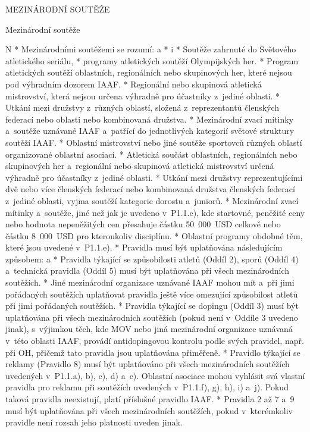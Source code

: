 \chap MEZINÁRODNÍ SOUTĚŽE

\secc Mezinárodní soutěže

\begitems \style N
* Mezinárodními soutěžemi se rozumí:
  \begitems \style a
  *
    \begitems \style i
    * Soutěže zahrnuté do Světového atletického seriálu,
    * programy atletických soutěží Olympijských her.
    \enditems
  * Program atletických soutěží oblastních, regionálních nebo skupinových her, které nejsou pod výhradním dozorem IAAF.
  * Regionální nebo skupinová atletická mistrovství, která nejsou určena výhradně pro účastníky z~jediné oblasti.
  * Utkání mezi družstvy z~různých oblastí, složená z~reprezentantů členských federací nebo oblasti nebo kombinovaná družstva.
  * Mezinárodní zvací mítinky a~soutěže uznávané IAAF a~patřící do jednotlivých kategorií světové struktury soutěží IAAF.
  * Oblastní mistrovství nebo jiné soutěže sportovců různých oblastí organizované oblastní asociací.
  * Atletická součást oblastních, regionálních nebo skupinových her a~regionální nebo skupinová atletická mistrovství určená výhradně pro účastníky z~jediné oblasti.
  * Utkání mezi družstvy reprezentujícími dvě nebo více členských federací nebo kombinovaná družstva členských federací z~jediné oblasti, vyjma soutěží kategorie dorostu a~juniorů.
  * Mezinárodní zvací mítinky a~soutěže, jiné než jak je uvedeno v~P1.1.e), kde startovné, peněžité ceny nebo hodnota nepeněžitých cen přesahuje částku 50~000~USD celkově nebo částku 8~000~USD pro kteroukoliv disciplínu.
  * Oblastní programy obdobné těm, které jsou uvedené v~P1.1.e).
  \enditems
* Pravidla musí být uplatňována následujícím způsobem:
  \begitems \style a
  * Pravidla týkající se způsobilosti atletů (Oddíl 2), sporů (Oddíl 4) a~technická pravidla (Oddíl 5) musí být uplatňována při všech mezinárodních soutěžích.
  * Jiné mezinárodní organizace uznávané IAAF mohou mít a~při jimi pořádaných soutěžích uplatňovat pravidla ještě více omezující způsobilost atletů při jimi pořádaných soutěžích.
  * Pravidla týkající se dopingu (Oddíl 3) musí být uplatňována při všech mezinárodních soutěžích (pokud není v~Oddíle 3 uvedeno jinak), s~výjimkou těch, kde MOV nebo jiná mezinárodní organizace uznávaná v~této oblasti IAAF, provádí antidopingovou kontrolu podle svých pravidel, např. při OH, přičemž tato pravidla jsou uplatňována přiměřeně.
  * Pravidlo týkající se reklamy (Pravidlo 8) musí být uplatňováno při všech mezinárodních soutěžích uvedených v~P1.1.a), b), c), d) a~e). Oblastní asociace mohou vyhlásit svá vlastní pravidla pro reklamu při soutěžích uvedených v~P1.1.f), g), h), i) a~j). Pokud taková pravidla neexistují, platí příslušné pravidlo IAAF.
  * Pravidla 2 až 7 a~9 musí být uplatňována při všech mezinárodních soutěžích, pokud v~kterémkoliv pravidle není rozsah jeho platnosti uveden jinak.
  \enditems
\enditems

